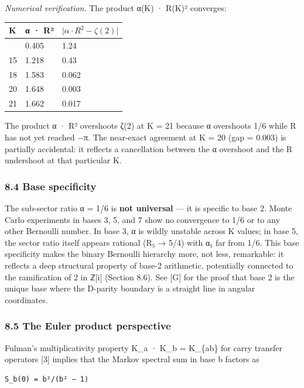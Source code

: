 \documentclass[
  11pt,
]{article}
\begin{document}
\emph{Numerical verification.} The product α(K) · R(K)² converges:

\begin{longtable}[]{@{}lll@{}}
\toprule\noalign{}
K & α · R² & \(\lvert \alpha \cdot R^2 - \zeta(2) \rvert\) \\
\midrule\noalign{}
\endhead
\bottomrule\noalign{}
\endlastfoot
11 & 0.405 & 1.24 \\
15 & 1.218 & 0.43 \\
18 & 1.583 & 0.062 \\
20 & 1.648 & 0.003 \\
21 & 1.662 & 0.017 \\
\end{longtable}

The product α · R² overshoots ζ(2) at K = 21 because α overshoots 1/6 while R
has not yet reached −π. The near-exact agreement at K = 20 (gap = 0.003) is
partially accidental: it reflects a cancellation between the α overshoot and the
R undershoot at that particular K.

\subsubsection{8.4 Base specificity}\label{base-specificity}

The sub-sector ratio α = 1/6 is \textbf{not universal} --- it is specific to
base 2. Monte Carlo experiments in bases 3, 5, and 7 show no convergence to 1/6
or to any other Bernoulli number. In base 3, α is wildly unstable across K
values; in base 5, the sector ratio itself appears rational (R₅ → 5/4) with α₅
far from 1/6. This base specificity makes the binary Bernoulli hierarchy more,
not less, remarkable: it reflects a deep structural property of base-2
arithmetic, potentially connected to the ramification of 2 in ℤ{[}i{]} (Section
8.6). See {[}G{]} for the proof that base 2 is the unique base where the
D-parity boundary is a straight line in angular coordinates.

\subsubsection{8.5 The Euler product
perspective}\label{the-euler-product-perspective}

Fulman's multiplicativity property K\_a · K\_b = K\_\{ab\} for carry transfer
operators {[}3{]} implies that the Markov spectral sum in base b factors as

\begin{verbatim}
S_b(0) = b²/(b² − 1)
\end{verbatim}
\end{document}
